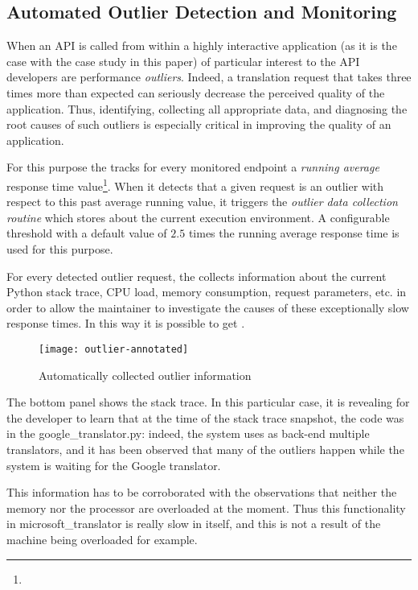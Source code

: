   \subsection{Automated Outlier Detection and Monitoring}
  
  When an API is called from within a highly interactive application (as it is the case with the case study in this paper) 
  of particular interest to the API developers are performance {\em outliers}.   Indeed, a translation request that takes three times more than expected can seriously decrease the perceived quality of the application. Thus, identifying, collecting all appropriate data, and diagnosing the root causes of such outliers is especially critical in improving the quality of an application. 
  
  
  For this purpose the \tool tracks for every monitored endpoint a {\em running average} response time value\footnote{}. When it detects that a given request is an outlier with respect to this past average running value, it triggers the {\em outlier data collection routine} which stores  about the current execution environment. A configurable threshold with a default value of $2.5$ times the running average response time is used for this purpose. 

  For every detected outlier request, the \tool collects information about the current Python stack trace, CPU load, memory consumption, request parameters, etc. in order to allow the maintainer to investigate the causes of these exceptionally slow response times. In this way it is possible to get .


  \begin{figure}[h!]
    \centering
    \texttt{[image: outlier-annotated]}
    \caption{Automatically collected outlier information}
    \label{fig:figure1}
  \end{figure}
  

The bottom panel shows the stack trace. 
In this particular case, it is revealing for the developer to learn that at the time of the stack trace snapshot, the code was in the google\_translator.py: indeed, the system uses as back-end multiple translators, and it has been observed that many of the outliers happen while the system is waiting for the Google translator.

This information has to be corroborated with the observations that neither the memory nor the processor are overloaded at the moment. Thus this functionality in microsoft\_translator is really slow in itself, and this is not a result of the machine being overloaded for example. 









